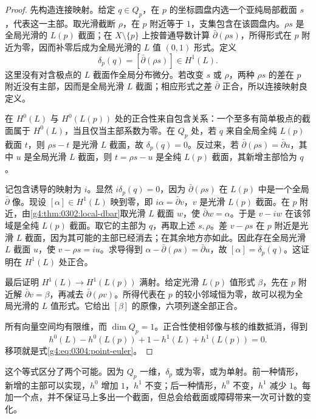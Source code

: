\begin{proof}
	先构造连接映射。给定 \(q\in Q_p\)，在 \(p\) 的坐标圆盘内选一个亚纯局部截面 \(s\)，代表这一主部。取光滑截断 \(\rho\)，在 \(p\) 附近等于 \(1\)，支集包含在该圆盘内。\(\rho s\) 是全局光滑的 \(L(p)\) 截面；在 \(X\setminus\{p\}\) 上按普通导数计算 \(\bar\partial(\rho s)\)，所得形式在 \(p\) 附近为零，因而补零后成为全局光滑的 \(L\) 值 \((0,1)\) 形式。定义
	\[
		\delta_p(q)=[\bar\partial(\rho s)]\in H^1(L).
	\]
	这里没有对含极点的 \(L\) 截面作全局分布微分。若改变 \(s\) 或 \(\rho\)，两种 \(\rho s\) 的差在 \(p\) 附近没有主部，因而是全局光滑 \(L\) 截面；相应形式之差 \(\bar\partial\) 正合，所以连接映射良定义。

	在 \(H^0(L)\) 与 \(H^0(L(p))\) 处的正合性来自包含关系：一个至多有简单极点的截面属于 \(H^0(L)\)，当且仅当主部系数为零。在 \(Q_p\) 处，若 \(q\) 来自全局全纯 \(L(p)\) 截面 \(t\)，则 \(\rho s-t\) 是光滑 \(L\) 截面，故 \(\delta_p(q)=0\)。反过来，若 \(\bar\partial(\rho s)=\bar\partial u\)，其中 \(u\) 是全局光滑 \(L\) 截面，则 \(t=\rho s-u\) 是全纯 \(L(p)\) 截面，其新增主部恰为 \(q\)。

	记包含诱导的映射为 \(i\)。显然 \(i\delta_p(q)=0\)，因为 \(\bar\partial(\rho s)\) 在 \(L(p)\) 中是一个全局 \(\bar\partial\) 像。现设 \([\alpha]\in H^1(L)\) 映到零，即 \(i\alpha=\bar\partial v\)，\(v\) 是光滑 \(L(p)\) 截面。在 \(p\) 附近，由\cref{g4:thm:0302:local-dbar}取光滑 \(L\) 截面 \(w\)，使 \(\bar\partial w=\alpha\)。于是 \(v-iw\) 在该邻域是全纯 \(L(p)\) 截面。取它的主部为 \(q\)，再取上述 \(s,\rho\)。差 \(v-\rho s\) 在 \(p\) 附近是光滑 \(L\) 截面，因为其可能的主部已经消去；在其余地方亦如此。因此存在全局光滑 \(L\) 截面 \(u\)，使 \(v-\rho s=iu\)。求导得到 \(\alpha-\bar\partial(\rho s)=\bar\partial u\)，故 \([\alpha]=\delta_p(q)\)。这证明在 \(H^1(L)\) 处正合。

	最后证明 \(H^1(L)\to H^1(L(p))\) 满射。给定光滑 \(L(p)\) 值形式 \(\beta\)，先在 \(p\) 附近解 \(\bar\partial v=\beta\)，再减去 \(\bar\partial(\rho v)\)。所得代表在 \(p\) 的较小邻域恒为零，故可以视为全局光滑的 \(L\) 值形式。它给出 \([\beta]\) 的原像，六项列遂全部正合。

	所有向量空间均有限维，而 \(\dim Q_p=1\)。正合性使相邻像与核的维数抵消，得到
	\[
		h^0(L)-h^0(L(p))+1-h^1(L)+h^1(L(p))=0.
	\]
	移项就是式\eqref{g4:eq:0304:point-euler}。
\end{proof}

这个等式区分了两个可能。因为 \(Q_p\) 一维，\(\delta_p\) 或为零，或为单射。前一种情形，新增的主部可以实现，\(h^0\) 增加 \(1\)，\(h^1\) 不变；后一种情形，\(h^0\) 不变，\(h^1\) 减少 \(1\)。每加一个点，并不保证马上多出一个截面，但总会给截面或障碍带来一次可计数的变化。

